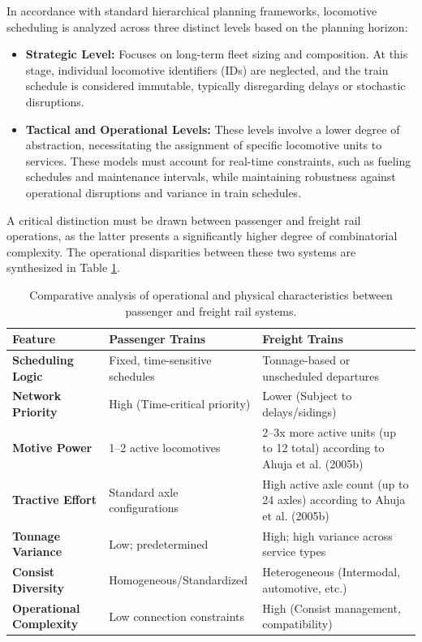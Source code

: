 \documentclass[a4paper]{scrartcl}
\begin{document}
In accordance with standard hierarchical planning frameworks, locomotive scheduling is analyzed across three distinct levels based on the planning horizon:
\begin{itemize}
    \item \textbf{Strategic Level:} Focuses on long-term fleet sizing and composition. At this stage, individual locomotive identifiers (IDs) are neglected, and the train schedule is considered immutable, typically disregarding delays or stochastic disruptions.
    \item \textbf{Tactical and Operational Levels:} These levels involve a lower degree of abstraction, necessitating the assignment of specific locomotive units to services. These models must account for real-time constraints, such as fueling schedules and maintenance intervals, while maintaining robustness against operational disruptions and variance in train schedules.
\end{itemize}

A critical distinction must be drawn between passenger and freight rail operations, as the latter presents a significantly higher degree of combinatorial complexity. The operational disparities between these two systems are synthesized in Table \ref{tab:difference_between_freight_and_passenger_trains}.

\begin{table}[H]
    \centering
    \renewcommand{\arraystretch}{1.3}
    \begin{tabular}{|p{3.5cm}|p{5.5cm}|p{6cm}|}
        \hline
        \textbf{Feature} & \textbf{Passenger Trains} & \textbf{Freight Trains} \\ \hline
        \textbf{Scheduling Logic} & Fixed, time-sensitive schedules & Tonnage-based or unscheduled departures \\ \hline
        \textbf{Network Priority} & High (Time-critical priority) & Lower (Subject to delays/sidings) \\ \hline
        \textbf{Motive Power} & 1--2 active locomotives & 2--3x more active units (up to 12 total) according to Ahuja et al. (2005b) \cite{Ahujaetal2005b} \\ \hline
        \textbf{Tractive Effort} & Standard axle configurations & High active axle count (up to 24 axles) according to Ahuja et al. (2005b) \cite{Ahujaetal2005b} \\ \hline
        \textbf{Tonnage Variance} & Low; predetermined & High; high variance across service types \\ \hline
        \textbf{Consist Diversity} & Homogeneous/Standardized & Heterogeneous (Intermodal, automotive, etc.) \cite{Vaidyanathanetal2008a} \\ \hline
        \textbf{Operational Complexity} & Low connection constraints & High (Consist management, compatibility) \\ \hline
    \end{tabular}
    \caption{Comparative analysis of operational and physical characteristics between passenger and freight rail systems.}
    \label{tab:difference_between_freight_and_passenger_trains}
\end{table}
\end{document}
